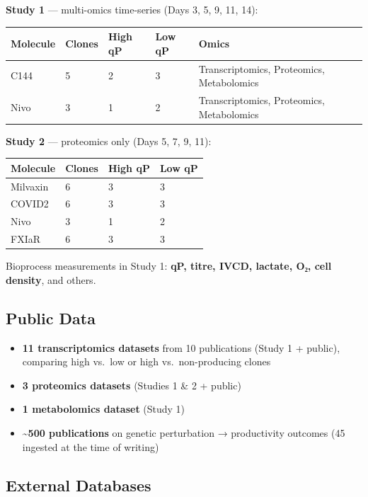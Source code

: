 \documentclass[
  letterpaper,
  oneside,
  open=any]{scrbook}
\newcounter{none} %
\providecommand{\tightlist}{%
  \setlength{\itemsep}{0pt}\setlength{\parskip}{0pt}}
\begin{document}
\textbf{Study 1} --- multi-omics time-series (Days 3, 5, 9, 11, 14):

{\def\LTcaptype{none} %
\begin{longtable}[]{@{}lllll@{}}
\toprule\noalign{}
Molecule & Clones & High qP & Low qP & Omics \\
\midrule\noalign{}
\endhead
\bottomrule\noalign{}
\endlastfoot
C144 & 5 & 2 & 3 & Transcriptomics, Proteomics, Metabolomics \\
Nivo & 3 & 1 & 2 & Transcriptomics, Proteomics, Metabolomics \\
\end{longtable}
}

\textbf{Study 2} --- proteomics only (Days 5, 7, 9, 11):

{\def\LTcaptype{none} %
\begin{longtable}[]{@{}llll@{}}
\toprule\noalign{}
Molecule & Clones & High qP & Low qP \\
\midrule\noalign{}
\endhead
\bottomrule\noalign{}
\endlastfoot
Milvaxin & 6 & 3 & 3 \\
COVID2 & 6 & 3 & 3 \\
Nivo & 3 & 1 & 2 \\
FXIaR & 6 & 3 & 3 \\
\end{longtable}
}

Bioprocess measurements in Study 1: \textbf{qP, titre, IVCD, lactate,
O₂, cell density}, and others.

\subsection{Public Data}\label{public-data}

\begin{itemize}
\tightlist
\item
  \textbf{11 transcriptomics datasets} from 10 publications (Study 1 +
  public), comparing high vs.~low or high vs.~non-producing clones
\item
  \textbf{3 proteomics datasets} (Studies 1 \& 2 + public)
\item
  \textbf{1 metabolomics dataset} (Study 1)
\item
  \textbf{\textasciitilde500 publications} on genetic perturbation →
  productivity outcomes (45 ingested at the time of writing)
\end{itemize}

\subsection{External Databases}\label{external-databases}
\end{document}
